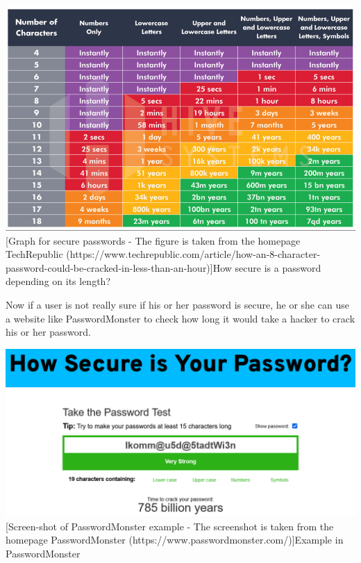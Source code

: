 \documentclass[conference]{IEEEtran}
\begin{document}
\begin{center}
\includegraphics[scale=0.335]{./images/brute_force.png}
[Graph for secure passwords - The figure is taken from the homepage TechRepublic (https://www.techrepublic.com/article/how-an-8-character-password-could-be-cracked-in-less-than-an-hour)]{How secure is a password depending on its length?}
\end{center}

Now if a user is not really sure if his or her password is secure, he or she can use a website like PasswordMonster to check how long it would take a hacker to crack his or her password.\cite{b9}

\begin{center}
\includegraphics[scale=0.37]{./images/PasswordMonster.png}
[Screen-shot of PasswordMonster example  - The screenshot is taken from the homepage PasswordMonster (https://www.passwordmonster.com/)]{Example in PasswordMonster}
\end{center}
\end{document}
